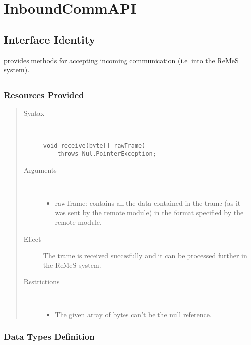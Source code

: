 \section{InboundCommAPI}
\label{api:rm-inbound-comm-api}

\subsection{Interface Identity}

\npar {} provides methods for accepting incoming
communication (i.e. into the ReMeS system).

\subsection{}

\subsubsection{Resources Provided}

\begin{quote}
	\begin{description}
		\item[Syntax] \
		\begin{verbatim}
void receive(byte[] rawTrame)
	throws NullPointerException;
		\end{verbatim}
		\item[Arguments] \
		\begin{itemize}
		  \item rawTrame: contains all the data contained in the trame (as it was
		  sent by the remote module) in the format specified by the remote module.
		\end{itemize}
		\item[Effect] The trame is received succesfully and it can be processed
		further in the ReMeS system.
		\item[Restrictions] \
		\begin{itemize}
		  \item The given array of bytes can't be the null reference.
		\end{itemize}
	\end{description} 
\end{quote}

\subsubsection{Data Types Definition}

